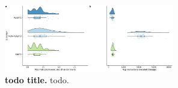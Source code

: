 \begin{figure}[h!]
    \centering
    \includegraphics[width=0.66\textwidth]{media/neutral-hitchhiking-panel.pdf}
    \caption{\small
    \textbf{todo title.}
    todo.
    }
    \label{fig:neutral-hitchhiking}
\end{figure}